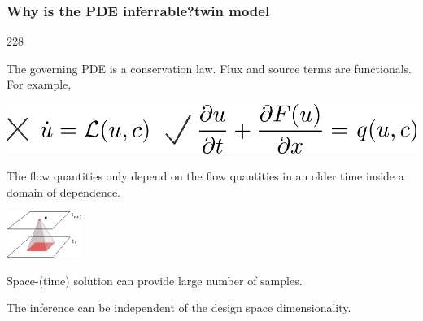 \documentclass{beamer}
\newcommand{\barrow}{\item[\color{darkred}\ding{228}]}
\begin{document}
\begin{frame}
    \frametitle{Why is the PDE inferrable?\hfill \scriptsize{twin model}}\small
    \begin{dinglist}{228}
        \barrow The governing PDE is a conservation law. Flux and source terms are functionals. For example,\\
        \vspace{-.1cm}
        \begin{center}
            \includegraphics[height=.7cm]{two_eqn.png}
        \end{center}
        \vspace{-.1cm}
        \barrow The flow quantities only depend on the flow quantities in an older time
                inside a domain of dependence.\\
        \vspace{-.1cm}
        \begin{center}
            \includegraphics[height=1.5cm]{locality.png}
        \end{center}
        \vspace{-.1cm}
        \barrow Space-(time) solution can provide large number of samples.
        \barrow The inference can be independent of the design space dimensionality.
    \end{dinglist}
\end{frame}
\end{document}
